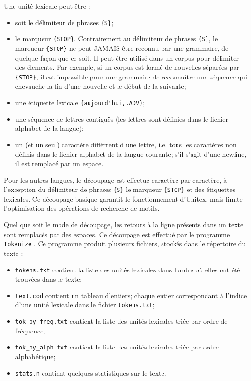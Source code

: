 \bigskip
\noindent Une unité lexicale peut être :
\begin{itemize}
  \item soit le délimiteur de phrases \verb+{S}+;
  \item le marqueur \verb+{STOP}+. Contrairement au délimiteur de phrases
  \verb+{S}+, le marqueur \verb+{STOP}+ ne peut JAMAIS être reconnu par une grammaire, de quelque
  façon que ce soit. Il peut être utilisé dans un corpus pour délimiter des élements. Par exemple,
  si un corpus est formé de nouvelles séparées par \verb+{STOP}+, il est impossible pour une
  grammaire de reconnaître une séquence qui chevauche la fin d'une nouvelle et le début de la
  suivante;
  \item une étiquette lexicale \verb+{aujourd'hui,.ADV}+;
  \item une séquence de lettres contiguës (les lettres sont définies dans le fichier alphabet de la
  langue);
  \item un (et un seul) caractère différrent d'une lettre, i.e. tous les caractères non définis
  dans le fichier alphabet de la langue courante; s'il s'agit d'une newline, il est remplacé par un
  espace.
\end{itemize}

\bigskip
\noindent Pour les autres langues, le découpage est effectué caractère par caractère, à l’exception
du délimiteur de phrases \verb+{S}+ le marqueur \verb+{STOP}+ et des étiquettes lexicales. Ce
découpage basique garantit le fonctionnement d’Unitex, mais limite l’optimisation des opérations de
recherche de motifs.


\bigskip
\noindent Quel que soit le mode de découpage, les retours à la ligne présents
dans un texte sont remplacés par des espaces. Ce découpage est effectué par le programme
\verb+Tokenize+ .
Ce programme produit plusieurs fichiers, stockés dans le répertoire du texte :
\begin{itemize}
  \item \verb+tokens.txt+ contient la liste des unités lexicales dans l’ordre où elles ont été
  	  trouvées dans le texte;
  \item \verb+text.cod+  contient un tableau d’entiers; chaque entier correspondant à l’indice d’une
  	  unité lexicale dans le fichier \verb+tokens.txt+;
  \item \verb+tok_by_freq.txt+ contient la liste des unités lexicales triée par ordre de fréquence;
  \item \verb+tok_by_alph.txt+ contient la liste des unités lexicales triée par ordre alphabétique;
\item \verb+stats.n+ contient quelques statistiques sur le texte. 
\end{itemize}

